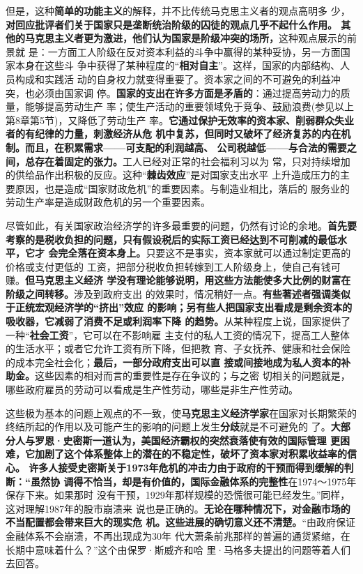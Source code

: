 但是，这种\textbf{简单的功能主义}的解释，并不比传统马克思主义者的观点高明多
少，\textbf{对回应批评者们关于国家只是垄断统治阶级的囚徒的观点几乎不起什么作用。
  其他的马克思主义者更为激进，他们认为国家是阶级冲突的场所，}这种观点展示的前景就
是：一方面工人阶级在反对资本利益的斗争中赢得的某种妥协，另一方面国家本身在这些斗
争中获得了某种程度的“\textbf{相对自主}”。这样，国家的内部结构、人员构成和实践活
动的自身权力就变得重要了。资本家之间的不可避免的利益冲突，也必须由国家调
停。\textbf{国家的支出在许多方面是矛盾的}：通过提高劳动力的质量，能够提高劳动生产
率；使生产活动的重要领域免于竞争、鼓励浪费(参见以上第8章第5节)，又降低了劳动生产
率。\textbf{它通过保护无效率的资本家、削弱群众失业者的有纪律的力量，刺激经济从危
  机中复苏，但同时又破坏了经济复苏的内在机制。而且，在积累需求——可支配的利润越高、
公司税越低——与合法的需要之间，总存在着固定的张力。}工人已经对正常的社会福利习以为
常，只对持续增加的供给品作出积极的反应。这种“\textbf{棘齿效应}”是对国家支出水平
上升造成压力的主要原因，也是造成“国家财政危机”的重要因素。与制造业相比，落后的
服务业的劳动生产率是造成财政危机的另一个重要因素。

尽管如此，有关国家政治经济学的许多最重要的问题，仍然有讨论的余地。\textbf{首先要
  考察的是税收负担的问题，只有假设税后的实际工资已经达到不可削减的最低水平，它才
  会完全落在资本身上。}只要这不是事实，资本家就可以通过制定更高的价格或支付更低的
工资，把部分税收负担转嫁到工人阶级身上，使自己有钱可赚。\textbf{但马克思主义经济
  学没有理论能够说明，用这些方法能使多大比例的财富在阶级之间转移。}涉及到政府支出
的效果时，情况稍好一点。\textbf{有些著述者强调类似于正统宏观经济学的“挤出”效应
  的影响；另有些人把国家支出看成是剩余资本的吸收器，它减弱了消费不足或利润率下降
  的趋势。}从某种程度上说，国家提供了一种“\textbf{社会工资}”，它可以在不影响雇
主支付的私人工资的情况下，提高工人整体的生活水平；或者它允许工资有所下降，但把教
育、子女抚养、健康和社会保险的成本完全社会化；\textbf{最后，一部分政府支出可以直
  接或间接地成为私人资本的补助金。}这些因素的相对而言的重要性是存在争议的；与之密
切相关的问题就是，哪些政府雇员的劳动可以看成是生产性劳动，哪些是非生产性劳动。

这些极为基本的问题上观点的不一致，使\textbf{马克思主义经济学家}在国家对长期繁荣的
终结所起的作用以及可能产生的影响的问题上发生\textbf{分歧}就是不可避免的
了。\textbf{大部分人与罗恩·史密斯一道认为，美国经济霸权的突然衰落使有效的国际管理
  更困难，它加剧了这个体系整体上的潜在的不稳定性，破坏了资本家对积累收益率的信心。
  许多人接受史密斯关于1973年危机的冲击力由于政府的干预而得到缓解的判断：“虽然协
  调得不恰当，却是有价值的，国际金融体系的完整性}在1974～1975年保存下来。如果那时
没有干预，1929年那样规模的恐慌很可能已经发生。”同样，这对理解1987年的股市崩溃来
说也是正确的。\textbf{无论在哪种情况下，对金融市场的不当配置都会带来巨大的现实危
  机。这些进展的确切意义还不清楚。}“由政府保证金融体系不会崩溃，不再出现成为30年
代大萧条前兆那样的普遍的通货紧缩，在长期中意味着什么？”这个由保罗·斯威齐和哈
里·马格多夫提出的问题等着人们去回答。

